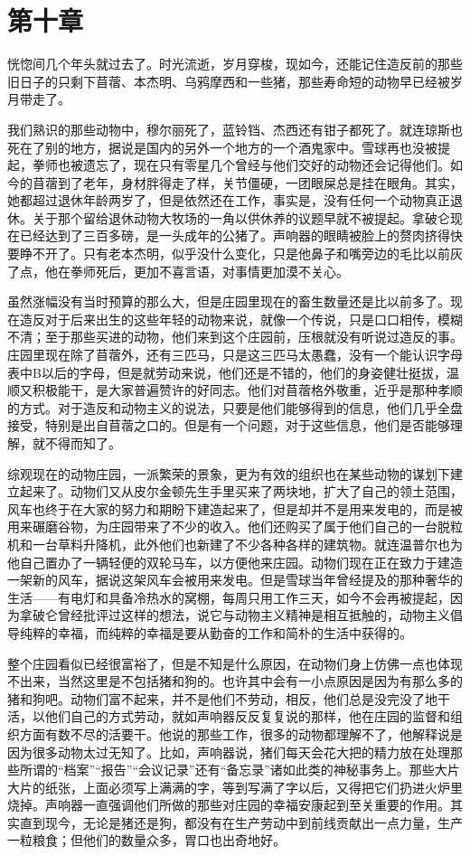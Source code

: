 \chapter{第十章}

恍惚间几个年头就过去了。时光流逝，岁月穿梭，现如今，还能记住造反前的那些旧日子的只剩下苜蓿、本杰明、乌鸦摩西和一些猪，那些寿命短的动物早已经被岁月带走了。

我们熟识的那些动物中，穆尔丽死了，蓝铃铛、杰西还有钳子都死了。就连琼斯也死在了别的地方，据说是国内的另外一个地方的一个酒鬼家中。雪球再也没被提起，拳师也被遗忘了，现在只有零星几个曾经与他们交好的动物还会记得他们。如今的苜蓿到了老年，身材胖得走了样，关节僵硬，一团眼屎总是挂在眼角。其实，她都超过退休年龄两岁了，但是依然还在工作，事实是，没有任何一个动物真正退休。关于那个留给退休动物大牧场的一角以供休养的议题早就不被提起。拿破仑现在已经达到了三百多磅，是一头成年的公猪了。声响器的眼睛被脸上的赘肉挤得快要睁不开了。只有老本杰明，似乎没什么变化，只是他鼻子和嘴旁边的毛比以前灰了点，他在拳师死后，更加不喜言语，对事情更加漠不关心。

虽然涨幅没有当时预算的那么大，但是庄园里现在的畜生数量还是比以前多了。现在造反对于后来出生的这些年轻的动物来说，就像一个传说，只是口口相传，模糊不清；至于那些买进的动物，他们来到这个庄园前，压根就没有听说过造反的事。庄园里现在除了苜蓿外，还有三匹马，只是这三匹马太愚蠢，没有一个能认识字母表中B以后的字母，但是就劳动来说，他们还是不错的，他们的身姿健壮挺拔，温顺又积极能干，是大家普遍赞许的好同志。他们对苜蓿格外敬重，近乎是那种孝顺的方式。对于造反和动物主义的说法，只要是他们能够得到的信息，他们几乎全盘接受，特别是出自苜蓿之口的。但是有一个问题，对于这些信息，他们是否能够理解，就不得而知了。

综观现在的动物庄园，一派繁荣的景象，更为有效的组织也在某些动物的谋划下建立起来了。动物们又从皮尔金顿先生手里买来了两块地，扩大了自己的领土范围，风车也终于在大家的努力和期盼下建造起来了，但是却并不是用来发电的，而是被用来碾磨谷物，为庄园带来了不少的收入。他们还购买了属于他们自己的一台脱粒机和一台草料升降机，此外他们也新建了不少各种各样的建筑物。就连温普尔也为他自己置办了一辆轻便的双轮马车，以方便他来庄园。动物们现在正在致力于建造一架新的风车，据说这架风车会被用来发电。但是雪球当年曾经提及的那种奢华的生活——有电灯和具备冷热水的窝棚，每周只用工作三天，如今不会再被提起，因为拿破仑曾经批评过这样的想法，说它与动物主义精神是相互抵触的，动物主义倡导纯粹的幸福，而纯粹的幸福是要从勤奋的工作和简朴的生活中获得的。

整个庄园看似已经很富裕了，但是不知是什么原因，在动物们身上仿佛一点也体现不出来，当然这里是不包括猪和狗的。也许其中会有一小点原因是因为有那么多的猪和狗吧。动物们富不起来，并不是他们不劳动，相反，他们总是没完没了地干活，以他们自己的方式劳动，就如声响器反反复复说的那样，他在庄园的监督和组织方面有数不尽的活要干。他说的那些工作，很多的动物都理解不了，他解释说是因为很多动物太过无知了。比如，声响器说，猪们每天会花大把的精力放在处理那些所谓的“档案”“报告”“会议记录”还有“备忘录”诸如此类的神秘事务上。那些大片大片的纸张，上面必须写上满满的字，等到写满了字以后，又得把它们扔进火炉里烧掉。声响器一直强调他们所做的那些对庄园的幸福安康起到至关重要的作用。其实直到现今，无论是猪还是狗，都没有在生产劳动中到前线贡献出一点力量，生产一粒粮食；但他们的数量众多，胃口也出奇地好。

